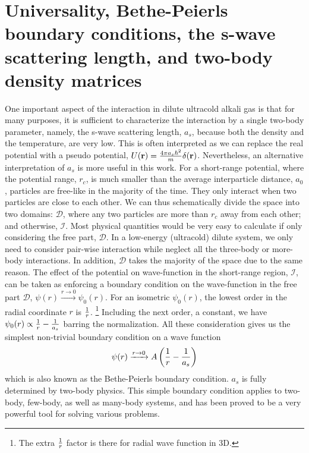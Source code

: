 \section{Universality,  Bethe-Peierls boundary conditions, the s-wave scattering length, and  two-body density matrices \label{sec:intro:as}}
One important aspect of the interaction in dilute ultracold alkali gas is that for many purposes, it is sufficient to characterize the interaction  by a single two-body parameter, namely, the s-wave scattering length, $a_s$,  because  both the density  and the temperature, are very  low. This is often interpreted as we can replace the real potential with a pseudo potential, $U(\mathbf{r})=\frac{4\pi{}a_{s}\hbar^{2}}{m}\delta(\mathbf{r})$\cite{pethick, LeggettBEC}.  Nevertheless, an alternative interpretation of $a_s$ \cite{LeggettBEC, Tan2008-1,Tan2008-2,CombescotTan} is more useful in this work.  For a short-range potential, where the potential range, $r_c$, is much smaller than the average interparticle distance, $a_0$,  particles are free-like  in the majority of the time.  They only interact  when two particles are close to each other.  We can thus schematically divide the space into two domains: $\mathcal{D}$, where any two particles are more than $r_c$ away from each other; and otherwise, $\mathcal{I}$. Most physical quantities would be very easy to calculate if only considering the free part, $\mathcal{D}$.  In a low-energy (ultracold) dilute system, we only need to consider  pair-wise interaction while neglect all the three-body or more-body interactions.  In addition,  $\mathcal{D}$ takes the majority of the space due to the same reason.     The effect of the potential on wave-function in the short-range region, $\mathcal{I}$, can be taken as   enforcing a boundary condition on the wave-function in the free part $\mathcal{D}$, $\psi(r)\xrightarrow{r\to0}\psi_{0}(r)$.  For an isometric $\psi_{0}(r)$, the lowest order in the radial coordinate $r$ is $\frac{1}{r}$. \footnote{The extra $\frac{1}{r}$ factor is there for  radial wave function in 3D.}  Including the next order, a constant,  we have $\psi_{0}(r)\propto\frac{1}{r}-\frac{1}{a_s}$ barring the normalization.  All these consideration gives us the simplest non-trivial boundary condition on  a wave function
\begin{equation}\label{eq:intro:Bethe}
\psi(r)\xrightarrow{r\to0}A\left(\frac{1}{r}-\frac{1}{a_s}\right)
\end{equation}
which is also known as the Bethe-Peierls boundary condition\cite{BethePeierls}.    $a_{s}$ is fully determined by two-body physics.  This simple boundary condition applies to two-body, few-body, as well as many-body systems, and has been proved to be a very powerful tool for solving various problems.  

